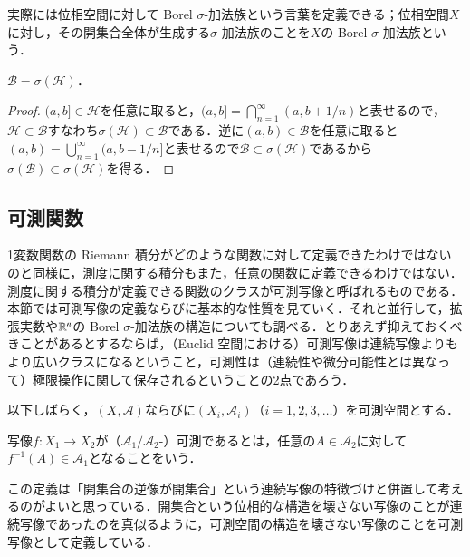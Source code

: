 \begin{dig}
実際には位相空間に対して Borel $\sigma$-加法族という言葉を定義できる；位相空間$X$に対し，その開集合全体が生成する$\sigma$-加法族のことを$X$の Borel $\sigma$-加法族という．
\end{dig}

\begin{prop}
$\mathcal{B} = \sigma(\mathcal{H})$．
\end{prop}

\begin{proof}
$(a,b] \in \mathcal{H}$を任意に取ると，$(a,b] = \bigcap_{n=1}^\infty (a,b + 1/n)$と表せるので，$\mathcal{H} \subset \mathcal{B}$すなわち$\sigma(\mathcal{H}) \subset \mathcal{B}$である．逆に$(a,b) \in \mathcal{B}$を任意に取ると$(a,b) = \bigcup_{n=1}^\infty (a,b-1/n]$と表せるので$\mathcal{B} \subset \sigma(\mathcal{H})$であるから$\sigma(\mathcal{B}) \subset \sigma(\mathcal{H})$を得る．
\end{proof}

\subsection{可測関数}

1変数関数の Riemann 積分がどのような関数に対して定義できたわけではないのと同様に，測度に関する積分もまた，任意の関数に定義できるわけではない．測度に関する積分が定義できる関数のクラスが可測写像と呼ばれるものである．本節では可測写像の定義ならびに基本的な性質を見ていく．それと並行して，拡張実数や$\mathbb{R}^n$の Borel $\sigma$-加法族の構造についても調べる．とりあえず抑えておくべきことがあるとするならば，（Euclid 空間における）可測写像は連続写像よりもより広いクラスになるということ，可測性は（連続性や微分可能性とは異なって）極限操作に関して保存されるということの2点であろう．

以下しばらく，$(X,\mathcal{A})$ならびに$(X_i,\mathcal{A}_i)$（$i=1,2,3,\dots$）を可測空間とする．

\begin{defi}
写像$f \colon X_1 \to X_2$が（$\mathcal{A}_1/\mathcal{A}_2$-）可測であるとは，任意の$A \in \mathcal{A}_2$に対して$f^{-1}(A)  \in \mathcal{A}_1$となることをいう．
\end{defi}

\begin{dig}
この定義は「開集合の逆像が開集合」という連続写像の特徴づけと併置して考えるのがよいと思っている．開集合という位相的な構造を壊さない写像のことが連続写像であったのを真似るように，可測空間の構造を壊さない写像のことを可測写像として定義している．
\end{dig}

